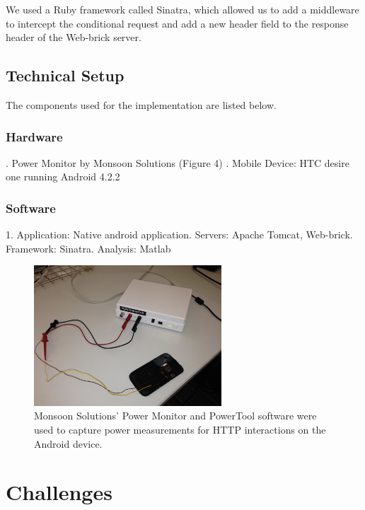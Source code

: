 \documentclass{sigplanconf}
\begin{document}
We used a Ruby framework called Sinatra, which allowed us to add a middleware to intercept the conditional request and add a new header field to the response header of the Web-brick server.

\subsection{Technical Setup}
The components used for the implementation are listed below.

\subsubsection{Hardware}

. Power Monitor by Monsoon Solutions (Figure 4) . Mobile Device: HTC desire one running Android 4.2.2

\subsubsection{Software}

1. Application: Native android application. Servers: Apache Tomcat, Web-brick. Framework: Sinatra. Analysis: Matlab\newline

\begin{figure}[ht!]
\centering
\includegraphics[width=70mm]{monitor.jpg}
\caption{Monsoon Solutions’ Power Monitor and PowerTool software were used to capture power measurements for HTTP interactions on the Android device.}
\label{fig:sp_gd_mnist}
\end{figure}

\section{ Challenges}
\end{document}
